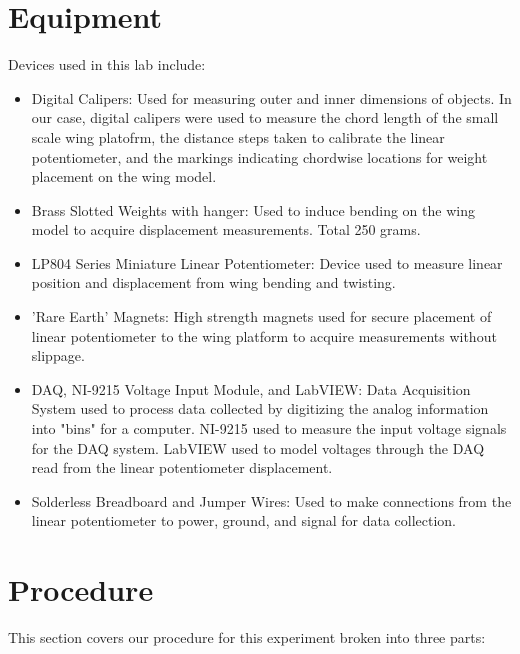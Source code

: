 \documentclass{article}
\begin{document}
\section{Equipment}
Devices used in this lab include:
\begin{itemize}

\item Digital Calipers: Used for measuring outer and inner dimensions of objects. In our case, digital calipers were used to measure the chord length of the small scale wing platofrm, the distance steps taken to calibrate the linear potentiometer, and the markings indicating chordwise locations for weight placement on the wing model.
\vspace{2.5mm}

\item Brass Slotted Weights with hanger: Used to induce bending on the wing model to acquire displacement measurements. Total 250 grams.
\vspace{2.5mm}

\item LP804 Series Miniature Linear Potentiometer: Device used to measure linear position and displacement from wing bending and twisting.
\vspace{2.5mm}

\item 'Rare Earth' Magnets: High strength magnets used for secure placement of linear potentiometer to the wing platform to acquire measurements without slippage.
\vspcae{2.5mm}

\item DAQ, NI-9215 Voltage Input Module, and LabVIEW: Data Acquisition System used to process data collected by digitizing the analog information into "bins" for a computer. NI-9215 used to measure the input voltage signals for the DAQ system. LabVIEW used to model voltages through the DAQ read from the linear potentiometer displacement.
\vspace{2.5mm}

\item Solderless Breadboard and Jumper Wires: Used to make connections from the linear potentiometer to power, ground, and signal for data collection.

\end{itemize}

\section{Procedure}
This section covers our procedure for this experiment broken into three parts:
\end{document}
